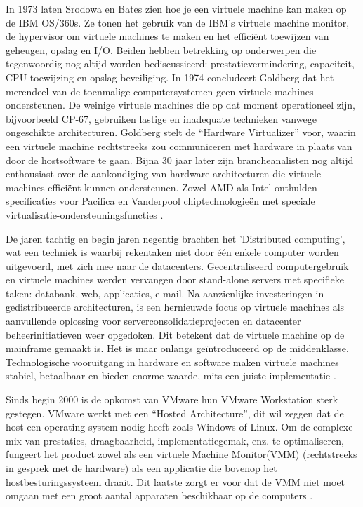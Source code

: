 In 1973 laten Srodowa en Bates zien hoe je een virtuele machine kan maken op de IBM OS/360s. Ze tonen het gebruik van de IBM's virtuele machine monitor, de hypervisor om virtuele machines te maken en het efficiënt toewijzen van geheugen, opslag en I/O. Beiden hebben betrekking op onderwerpen die tegenwoordig nog altijd worden bediscussieerd: prestatievermindering, capaciteit, CPU-toewijzing en opslag beveiliging. In 1974 concludeert Goldberg dat het merendeel van de toenmalige computersystemen geen virtuele machines ondersteunen. De weinige virtuele machines die op dat moment operationeel zijn, bijvoorbeeld CP-67, gebruiken lastige en inadequate technieken vanwege ongeschikte architecturen. Goldberg stelt de “Hardware Virtualizer” voor, waarin een virtuele machine rechtstreeks zou communiceren met hardware in plaats van door de hostsoftware te gaan. Bijna 30 jaar later zijn brancheanalisten nog altijd enthousiast over de aankondiging van hardware-architecturen die virtuele machines efficiënt kunnen ondersteunen. Zowel AMD als Intel onthulden specificaties voor Pacifica en Vanderpool chiptechnologieën met speciale virtualisatie-ondersteuningsfuncties \autocite{Ameen2013}.

De jaren tachtig en begin jaren negentig brachten het 'Distributed computing', wat een techniek is waarbij rekentaken niet door één enkele computer worden uitgevoerd,  met zich mee naar de datacenters. Gecentraliseerd computergebruik en virtuele machines werden vervangen door stand-alone servers met specifieke taken: databank, web, applicaties, e-mail. Na aanzienlijke investeringen in gedistribueerde architecturen, is een hernieuwde focus op virtuele machines als aanvullende oplossing voor serverconsolidatieprojecten en datacenter beheerinitiatieven weer opgedoken. Dit betekent dat de virtuele machine op de mainframe gemaakt is. Het is maar onlangs geïntroduceerd op de middenklasse. Technologische vooruitgang in hardware en software maken virtuele machines stabiel, betaalbaar en bieden enorme waarde, mits een juiste implementatie \autocite{Jeff2009}.

Sinds begin 2000 is de opkomst van VMware hun VMware Workstation sterk gestegen. VMware werkt met een “Hosted Architecture”, dit wil zeggen dat de host een operating system nodig heeft zoals Windows of Linux. Om de complexe mix van prestaties, draagbaarheid, implementatiegemak, enz. te optimaliseren, fungeert het product zowel als een virtuele Machine Monitor(VMM) (rechtstreeks in gesprek met de hardware) als  een applicatie die bovenop het hostbesturingssysteem draait. Dit laatste zorgt er voor dat de VMM niet moet omgaan met een groot aantal apparaten beschikbaar op de computers \autocite{Singh2004}.

